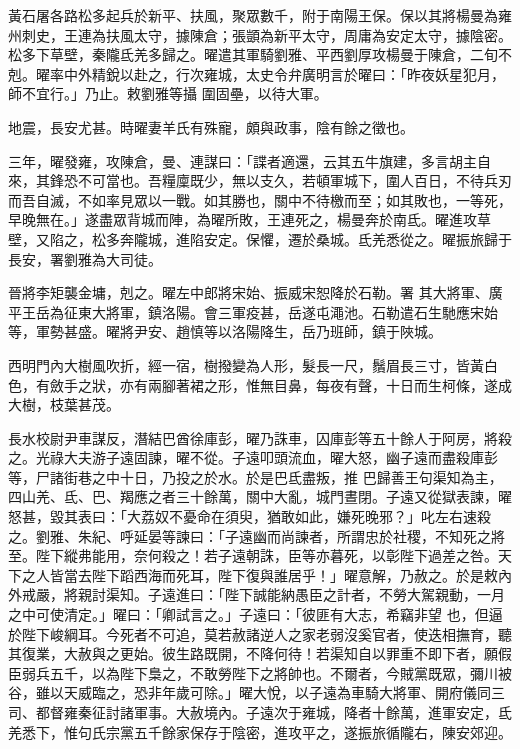\begin{pinyinscope}
 黃石屠各路松多起兵於新平、扶風，聚眾數千，附于南陽王保。保以其將楊曼為雍州刺史，王連為扶風太守，據陳倉；張顗為新平太守，周庸為安定太守，據陰密。松多下草壁，秦隴氐羌多歸之。曜遣其軍騎劉雅、平西劉厚攻楊曼于陳倉，二旬不剋。曜率中外精銳以赴之，行次雍城，太史令弁廣明言於曜曰：「昨夜妖星犯月，師不宜行。」乃止。敕劉雅等攝
 圍固壘，以待大軍。



 地震，長安尤甚。時曜妻羊氏有殊寵，頗與政事，陰有餘之徵也。



 三年，曜發雍，攻陳倉，曼、連謀曰：「諜者適還，云其五牛旗建，多言胡主自來，其鋒恐不可當也。吾糧廩既少，無以支久，若頓軍城下，圍人百日，不待兵刃而吾自滅，不如率見眾以一戰。如其勝也，關中不待檄而至；如其敗也，一等死，早晚無在。」遂盡眾背城而陣，為曜所敗，王連死之，楊曼奔於南氐。曜進攻草壁，又陷之，松多奔隴城，進陷安定。保懼，遷於桑城。氐羌悉從之。曜振旅歸于長安，署劉雅為大司徒。



 晉將李矩襲金墉，剋之。曜左中郎將宋始、振威宋恕降於石勒。署
 其大將軍、廣平王岳為征東大將軍，鎮洛陽。會三軍疫甚，岳遂屯澠池。石勒遣石生馳應宋始等，軍勢甚盛。曜將尹安、趙慎等以洛陽降生，岳乃班師，鎮于陜城。



 西明門內大樹風吹折，經一宿，樹撥變為人形，髮長一尺，鬚眉長三寸，皆黃白色，有斂手之狀，亦有兩腳著裙之形，惟無目鼻，每夜有聲，十日而生柯條，遂成大樹，枝葉甚茂。



 長水校尉尹車謀反，潛結巴酋徐庫彭，曜乃誅車，囚庫彭等五十餘人于阿房，將殺之。光祿大夫游子遠固諫，曜不從。子遠叩頭流血，曜大怒，幽子遠而盡殺庫彭等，尸諸街巷之中十日，乃投之於水。於是巴氐盡叛，推
 巴歸善王句渠知為主，四山羌、氐、巴、羯應之者三十餘萬，關中大亂，城門晝閉。子遠又從獄表諫，曜怒甚，毀其表曰：「大荔奴不憂命在須臾，猶敢如此，嫌死晚邪？」叱左右速殺之。劉雅、朱紀、呼延晏等諫曰：「子遠幽而尚諫者，所謂忠於社稷，不知死之將至。陛下縱弗能用，奈何殺之！若子遠朝誅，臣等亦暮死，以彰陛下過差之咎。天下之人皆當去陛下蹈西海而死耳，陛下復與誰居乎！」曜意解，乃赦之。於是敕內外戒嚴，將親討渠知。子遠進曰：「陛下誠能納愚臣之計者，不勞大駕親動，一月之中可使清定。」曜曰：「卿試言之。」子遠曰：「彼匪有大志，希竊非望
 也，但逼於陛下峻綱耳。今死者不可追，莫若赦諸逆人之家老弱沒奚官者，使迭相撫育，聽其復業，大赦與之更始。彼生路既開，不降何待！若渠知自以罪重不即下者，願假臣弱兵五千，以為陛下梟之，不敢勞陛下之將帥也。不爾者，今賊黨既眾，彌川被谷，雖以天威臨之，恐非年歲可除。」曜大悅，以子遠為車騎大將軍、開府儀同三司、都督雍秦征討諸軍事。大赦境內。子遠次于雍城，降者十餘萬，進軍安定，氐羌悉下，惟句氏宗黨五千餘家保存于陰密，進攻平之，遂振旅循隴右，陳安郊迎。




\end{pinyinscope}
